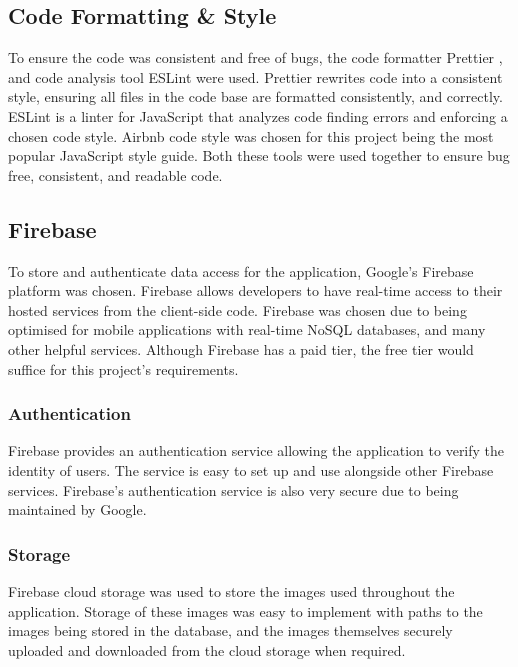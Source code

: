 \subsection{Code Formatting \& Style} \label{CodeF&S}
To ensure the code was consistent and free of bugs, the code formatter Prettier \cite{prettier}, and code analysis tool ESLint \cite{eslint} were used. Prettier rewrites code into a consistent style, ensuring all files in the code base are formatted consistently, and correctly. ESLint is a linter for JavaScript that analyzes code finding errors and enforcing a chosen code style. Airbnb \cite{airbnb} code style was chosen for this project being the most popular JavaScript style guide. Both these tools were used together to ensure bug free, consistent, and readable code. 
\subsection{Firebase}\label{firebaseSection}
To store and authenticate data access for the application, Google's Firebase \cite{firebase} platform was chosen. Firebase allows developers to have real-time access to their hosted services from the client-side code. Firebase was chosen due to being optimised for mobile applications with real-time NoSQL \cite{nosql} databases, and many other helpful services. Although Firebase has a paid tier, the free tier would suffice for this project's requirements.     
\subsubsection{Authentication}
Firebase provides an authentication service allowing the application to verify the identity of users. The service is easy to set up and use alongside other Firebase services. Firebase's authentication service is also very secure due to being maintained by Google.
\subsubsection{Storage}
Firebase cloud storage was used to store the images used throughout the application. Storage of these images was easy to implement with paths to the images being stored in the database, and the images themselves securely uploaded and downloaded from the cloud storage when required.
